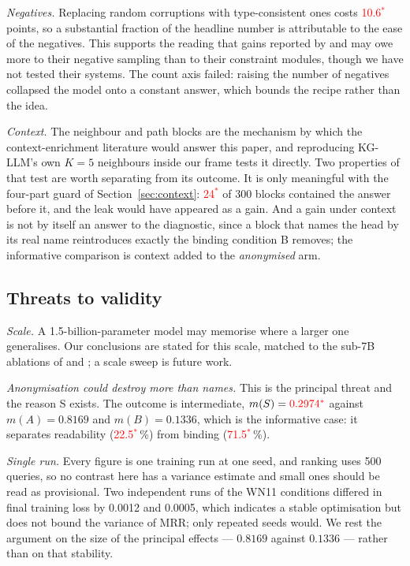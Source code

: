 \documentclass[conference]{IEEEtran}
\newcommand{\pv}[1]{\textcolor{red}{#1\ensuremath{^{\ast}}}}
\begin{document}
\emph{Negatives.} Replacing random corruptions with type-consistent ones costs
\pv{10.6} points, so a substantial fraction of the headline number is
attributable to the ease of the negatives. This supports the reading that gains
reported by \cite{realkgc} and \cite{cats} may owe more to their negative
sampling than to their constraint modules, though we have not tested their
systems. The count axis failed: raising the number of negatives collapsed the
model onto a constant answer, which bounds the recipe rather than the idea.

\emph{Context.} The neighbour and path blocks are the mechanism by which the
context-enrichment literature would answer this paper, and reproducing KG-LLM's
own $K=5$ neighbours inside our frame tests it directly. Two properties of that
test are worth separating from its outcome. It is only meaningful with the
four-part guard of Section~\ref{sec:context}: \pv{24} of 300 blocks contained
the answer before it, and the leak would have appeared as a gain. And a gain under
context is not by itself an answer to the diagnostic, since a block that names
the head by its real name reintroduces exactly the binding condition B removes;
the informative comparison is context added to the \emph{anonymised} arm.

\subsection{Threats to validity}
\label{sec:threats}

\emph{Scale.} A 1.5-billion-parameter model may memorise where a larger one
generalises. Our conclusions are stated for this scale, matched to the sub-7B
ablations of \cite{cats} and \cite{gskgc}; a scale sweep is future work.

\emph{Anonymisation could destroy more than names.} This is the principal threat
and the reason S exists. The outcome is intermediate, $m(S)=\pv{0.2974}$ against
$m(A)=0.8169$ and $m(B)=0.1336$, which is the informative case: it separates
readability (\pv{22.5}\,\%) from binding (\pv{71.5}\,\%).

\emph{Single run.} Every figure is one training run at one seed, and ranking uses
500 queries, so no contrast here has a variance estimate and small ones should be
read as provisional. Two independent runs of the WN11 conditions differed in
final training loss by 0.0012 and 0.0005, which indicates a stable optimisation
but does not bound the variance of MRR; only repeated seeds would. We rest the
argument on the size of the principal effects --- $0.8169$ against $0.1336$ ---
rather than on that stability.
\end{document}
